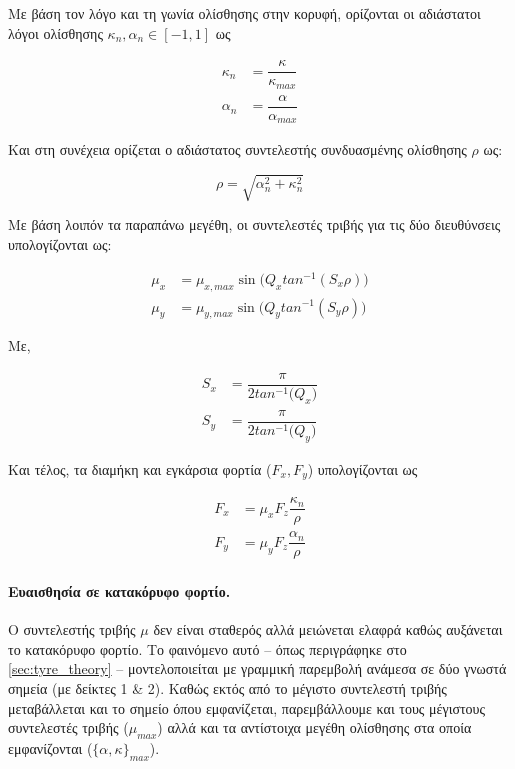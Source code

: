 Με βάση τον λόγο και τη γωνία ολίσθησης στην κορυφή, ορίζονται οι αδιάστατοι λόγοι ολίσθησης $\kappa_n, \alpha_n \in [-1,1]$ ως

\begin{align}
    \kappa_n &= \dfrac{\kappa}{\kappa_{max}}\\[10pt]
    \alpha_n &= \dfrac{\alpha}{\alpha_{max}}
\end{align}

Και στη συνέχεια ορίζεται ο αδιάστατος συντελεστής συνδυασμένης ολίσθησης $\rho$ ως:

\begin{equation}
    \rho = \sqrt{\alpha_n^2 + \kappa_n^2}
\end{equation}

Με βάση λοιπόν τα παραπάνω μεγέθη, οι συντελεστές τριβής για τις δύο διευθύνσεις υπολογίζονται ως:

\begin{align}
    \mu_x &= \mu_{x,max}\sin\bigl(Q_xtan^{-1}(
         S_x\rho )\bigr)\\[10pt]
    \mu_y &= \mu_{y,max}\sin\bigl(Q_ytan^{-1}(
         S_y\rho )\bigr)
\end{align}

Με,

\begin{align}
    S_x &= \dfrac{\pi}{2tan^{-1}\bigl(Q_x\bigr)}\\[10pt]
    S_y &= \dfrac{\pi}{2tan^{-1}\bigl(Q_y\bigr)}
\end{align}

Και τέλος, τα διαμήκη και εγκάρσια φορτία ($F_x, F_y$) υπολογίζονται ως

\begin{align}
    F_x &= \mu_xF_z\dfrac{\kappa_n}{\rho}\\[10pt]
    F_y &= \mu_yF_z\dfrac{\alpha_n}{\rho}
\end{align}


\paragraph{Ευαισθησία σε κατακόρυφο φορτίο.}
Ο συντελεστής τριβής $\mu$ δεν είναι σταθερός αλλά μειώνεται ελαφρά καθώς αυξάνεται το
κατακόρυφο φορτίο. Το φαινόμενο αυτό -- όπως περιγράφηκε στο \cref{sec:tyre_theory} -- μοντελοποιείται
με γραμμική παρεμβολή ανάμεσα σε δύο γνωστά σημεία (με δείκτες 1 \& 2).
Καθώς εκτός από το μέγιστο συντελεστή τριβής μεταβάλλεται και το σημείο όπου εμφανίζεται,
παρεμβάλλουμε και τους μέγιστους συντελεστές τριβής ($\mu_{max}$) αλλά και τα αντίστοιχα μεγέθη ολίσθησης στα οποία εμφανίζονται ($\{\alpha, \kappa\}_{max}$).

